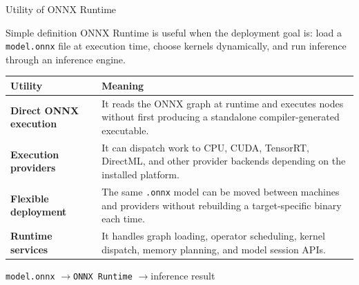 \documentclass[aspectratio=169,10pt]{beamer}
\newcommand{\code}[1]{\texttt{\footnotesize #1}}
\newcommand{\edgeword}[1]{\textcolor{red!75!black}{\textbf{#1}}}
\begin{document}
\begin{frame}{Utility of ONNX Runtime}
  \scriptsize
  \begin{block}{Simple definition}
    ONNX Runtime is useful when the deployment goal is: load a \code{model.onnx} file at execution time, choose kernels dynamically, and run inference through an inference engine.
  \end{block}

  \vspace{0.25em}
  \begin{tabularx}{\textwidth}{@{}lX@{}}
    \toprule
    Utility & Meaning \\
    \midrule
    \edgeword{Direct ONNX execution} &
      It reads the ONNX graph at runtime and executes nodes without first producing a standalone compiler-generated executable. \\
    \edgeword{Execution providers} &
      It can dispatch work to CPU, CUDA, TensorRT, DirectML, and other provider backends depending on the installed platform. \\
    \edgeword{Flexible deployment} &
      The same \code{.onnx} model can be moved between machines and providers without rebuilding a target-specific binary each time. \\
    \edgeword{Runtime services} &
      It handles graph loading, operator scheduling, kernel dispatch, memory planning, and model session APIs. \\
    \bottomrule
  \end{tabularx}

  \vspace{0.35em}
  \begin{center}
    \code{model.onnx} \quad$\rightarrow$\quad \code{ONNX Runtime} \quad$\rightarrow$\quad inference result
  \end{center}
\end{frame}
\end{document}

